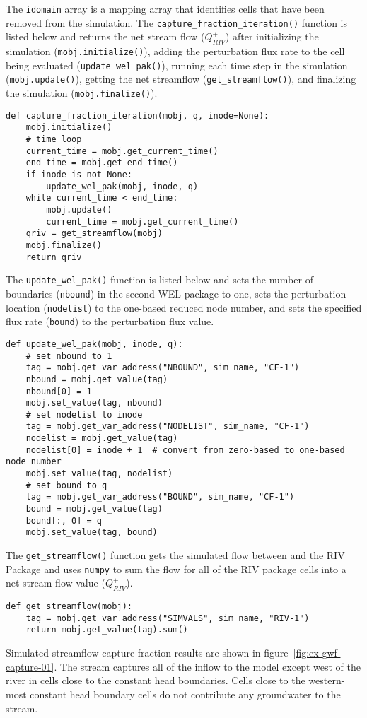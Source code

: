 \noindent The \texttt{idomain} array is a mapping array that identifies cells that have been removed from the simulation. The \texttt{capture\_fraction\_iteration()} function is listed below and returns the net stream flow ($Q_{RIV}^{+}$) after initializing the simulation (\texttt{mobj.initialize()}), adding the perturbation flux rate to the cell being evaluated (\texttt{update\_wel\_pak()}), running each time step in the simulation (\texttt{mobj.update()}), getting the net streamflow (\texttt{get\_streamflow()}), and finalizing the simulation (\texttt{mobj.finalize()}).

\begin{lstlisting}
def capture_fraction_iteration(mobj, q, inode=None):
    mobj.initialize()
    # time loop
    current_time = mobj.get_current_time()
    end_time = mobj.get_end_time()
    if inode is not None:
        update_wel_pak(mobj, inode, q)
    while current_time < end_time:
        mobj.update()
        current_time = mobj.get_current_time()
    qriv = get_streamflow(mobj)
    mobj.finalize()
    return qriv
\end{lstlisting}

\noindent The \texttt{update\_wel\_pak()} function is listed below and sets the number of boundaries (\texttt{nbound}) in the second WEL package to one, sets the perturbation location (\texttt{nodelist}) to the one-based reduced node number, and sets the specified flux rate (\texttt{bound}) to the perturbation flux value.

\begin{lstlisting}
def update_wel_pak(mobj, inode, q):
    # set nbound to 1
    tag = mobj.get_var_address("NBOUND", sim_name, "CF-1")
    nbound = mobj.get_value(tag)
    nbound[0] = 1
    mobj.set_value(tag, nbound)
    # set nodelist to inode
    tag = mobj.get_var_address("NODELIST", sim_name, "CF-1")
    nodelist = mobj.get_value(tag)
    nodelist[0] = inode + 1  # convert from zero-based to one-based node number
    mobj.set_value(tag, nodelist)
    # set bound to q
    tag = mobj.get_var_address("BOUND", sim_name, "CF-1")
    bound = mobj.get_value(tag)
    bound[:, 0] = q
    mobj.set_value(tag, bound)
\end{lstlisting}

\noindent The \texttt{get\_streamflow()} function gets the simulated flow between \MF and the RIV Package and uses \texttt{numpy} to sum the flow for all of the RIV package cells into a net stream flow value ($Q_{RIV}^{+}$). 

\begin{lstlisting}
def get_streamflow(mobj):
    tag = mobj.get_var_address("SIMVALS", sim_name, "RIV-1")
    return mobj.get_value(tag).sum()
\end{lstlisting}

Simulated streamflow capture fraction results are shown in figure~\ref{fig:ex-gwf-capture-01}. The stream captures all of the inflow to the model except west of the river in cells close to the constant head boundaries. Cells close to the western-most constant head boundary cells do not contribute any groundwater to the stream.


